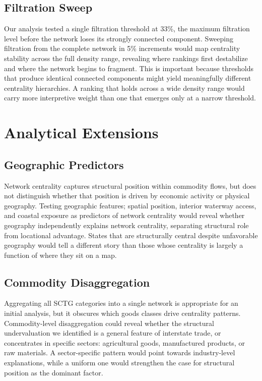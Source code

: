 \documentclass[12pt,oneside]{book}
\begin{document}
\subsection{Filtration Sweep}

Our analysis tested a single filtration threshold at 33\%, the maximum filtration level before the network loses its strongly connected component. Sweeping filtration from the complete network in 5\% increments would map centrality stability across the full density range, revealing where rankings first destabilize and where the network begins to fragment. This is important because thresholds that produce identical connected components might yield meaningfully different centrality hierarchies. A ranking that holds across a wide density range would carry more interpretive weight than one that emerges only at a narrow threshold. 

\section{Analytical Extensions}
\subsection{Geographic Predictors}
Network centrality captures structural position within commodity flows, but does not distinguish whether that position is driven by economic activity or physical geography. Testing geographic features; spatial position, interior waterway access, and coastal exposure as predictors of network centrality would reveal whether geography independently explains network centrality, separating structural role from locational advantage. States that are structurally central despite unfavorable geography would tell a different story than those whose centrality is largely a function of where they sit on a map. 

\subsection{Commodity Disaggregation}
Aggregating all SCTG categories into a single network is appropriate for an initial analysis, but it obscures which goods classes drive centrality patterns. Commodity-level disaggregation could reveal whether the structural undervaluation we identified is a general feature of interstate trade, or concentrates in specific sectors: agricultural goods, manufactured products, or raw materials. A sector-specific pattern would point towards industry-level explanations, while a uniform one would strengthen the case for structural position as the dominant factor. 
\end{document}
